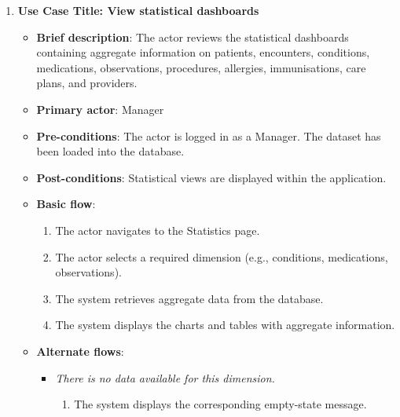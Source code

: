 \begin{enumerate}
\item \textbf{Use Case Title: View statistical dashboards}
\begin{itemize}
    \item \textbf{Brief description}: The actor reviews the statistical dashboards containing aggregate information on patients, encounters, conditions, medications, observations, procedures, allergies, immunisations, care plans, and providers.
    \item \textbf{Primary actor}: Manager
    \item \textbf{Pre-conditions}: The actor is logged in as a Manager. The dataset has been loaded into the database.
    \item \textbf{Post-conditions}: Statistical views are displayed within the application.
    \item \textbf{Basic flow}:
    \begin{enumerate}
        \item The actor navigates to the Statistics page.
        \item The actor selects a required dimension (e.g., conditions, medications, observations).
        \item The system retrieves aggregate data from the database.
        \item The system displays the charts and tables with aggregate information.
    \end{enumerate}
    \item \textbf{Alternate flows}:
    \begin{itemize}
        \item[3a.] \textit{There is no data available for this dimension.}
        \begin{enumerate}
            \item The system displays the corresponding empty-state message.
        \end{enumerate}
    \end{itemize}
\end{itemize}

\vspace{0.5em}


\end{enumerate}
